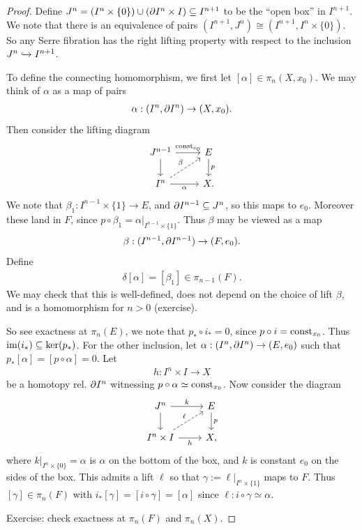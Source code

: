 \documentclass{article}[11pt]
\begin{document}
\begin{proof} Define $J^n = (I^n \times \{0\}) \cup (\partial I^n \times I) \subseteq I^{n+1}$ to be the ``open box'' in $I^{n+1}$. We note that there is an equivalence of pairs $(I^{n+1}, J^n) \cong (I^{n+1}, I^n\times\{0\})$. So any Serre fibration has the right lifting property with respect to the inclusion $J^n \xhookrightarrow{} I^{n+1}$.

To define the connecting homomorphism, we first let $[\alpha] \in \pi_n (X,x_0)$. We may think of $\alpha$ as a map of pairs
\begin{align*}
	\alpha : (I^n, \partial I^n) \to (X,x_0).
\end{align*}
Then consider the lifting diagram
\[
	\begin{tikzcd}
	J^{n-1}\rar["\const_{e_0}" above]\dar & E\dar["p" right] \\
	I^n \ar[ur,dashed,"\beta"]\rar["\alpha" below] & X.
	\end{tikzcd}
\]
We note that $\beta_1 : I^{n-1}\times\{1\} \to E$, and $\partial I^{n-1} \subseteq J^n$, so this maps to $e_0$. Moreover these land in $F$, since $p\circ\beta_1 = \left. \alpha\right|_{I^{n-1}\times\{1\}}$. Thus $\beta$ may be viewed as a map
\begin{align*}
	\beta: (I^{n-1},\partial I^{n-1}) \to (F,e_0).
\end{align*}
Define
\begin{align*}
	\delta [\alpha] = [\beta_1] \in \pi_{n-1}(F).
\end{align*}
We may check that this is well-defined, does not depend on the choice of lift $\beta$, and is a homomorphism for $n>0$ (exercise).

So see exactness at $\pi_n(E)$, we note that $p_\ast \circ i_\ast = 0$, since $p\circ i = \text{const}_{x_0}$. Thus $\text{im}(i_\ast)\subseteq \ker(p_\ast)$. For the other inclusion, let $\alpha: (I^n,\partial I^{n}) \to (E,e_0)$ such that $p_\ast [\alpha] = [p\circ \alpha] = 0$. Let
\begin{align*}
	h: I^n \times I \to X
\end{align*}
be a homotopy rel. $\partial I^n$ witnessing $p\circ \alpha \simeq \text{const}_{x_0}$. Now consider the diagram
\[
	\begin{tikzcd}
	J^n\rar["k" above]\dar & E\dar["p" right] \\
	I^n\times I \ar[ur,dashed,"\ell"]\rar["h" below] & X,
	\end{tikzcd}
\]
where $\left. k \right|_{I^n\times\{0\}} = \alpha$ is $\alpha$ on the bottom of the box, and $k$ is constant $e_0$ on the sides of the box. This admits a lift $\ell$ so that $\gamma := \left. \ell\right|_{I^n\times\{1\}}$ maps to $F$. Thus $[\gamma] \in \pi_n(F)$ with $i_\ast [\gamma] = [i\circ\gamma] = [\alpha]$ since $\ell: i\circ \gamma \simeq \alpha$.

Exercise: check exactness at $\pi_n(F)$ and $\pi_n(X)$.
\end{proof}
\end{document}
